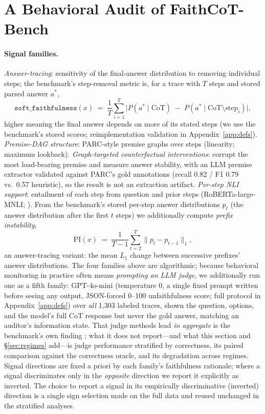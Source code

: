 \documentclass{article}
\begin{document}
\section{A Behavioral Audit of FaithCoT-Bench}
\label{sec:audit}

\paragraph{Signal families.} \emph{Answer-tracing}: sensitivity of the final-answer distribution to removing individual steps; the benchmark's step-removal metric is, for a trace with $T$ steps and stored parsed answer $a^{\ast}$,
\begin{equation}\label{eq:soft}
\texttt{soft\_faithfulness}(x) \;=\; \frac{1}{T}\sum_{i=1}^{T}\bigl\lvert P(a^{\ast}\mid \mathrm{CoT}) \;-\; P(a^{\ast}\mid \mathrm{CoT}\setminus \mathrm{step}_i)\bigr\rvert,
\end{equation}
higher meaning the final answer depends on more of its stated steps (we use the benchmark's stored scores; reimplementation validation in Appendix~\ref{app:defs}). \emph{Premise-DAG structure}: PARC-style premise graphs over steps (linearity; maximum lookback). \emph{Graph-targeted counterfactual interventions}: corrupt the most load-bearing premise and measure answer stability, with an LLM premise extractor validated against PARC's gold annotations (recall 0.82 / F1 0.79 vs.\ 0.57 heuristic), so the result is not an extraction artifact. \emph{Per-step NLI support}: entailment of each step from question and prior steps (RoBERTa-large-MNLI; \citealp{liu2019roberta,williams2018mnli}). From the benchmark's stored per-step answer distributions $p_t$ (the answer distribution after the first $t$ steps) we additionally compute \emph{prefix instability},
\begin{equation}\label{eq:pi}
\mathrm{PI}(x) \;=\; \frac{1}{T-1}\sum_{t=2}^{T}\bigl\lVert p_t - p_{t-1}\bigr\rVert_1,
\end{equation}
an answer-tracing variant: the mean $L_1$ change between successive prefixes' answer distributions. The four families above are algorithmic; because behavioral monitoring in practice often means \emph{prompting an LLM judge}, we additionally run one as a fifth family: GPT-4o-mini (temperature 0, a single fixed prompt written before seeing any output, JSON-forced 0--100 unfaithfulness score; full protocol in Appendix~\ref{app:defs}) over \emph{all} 1{,}303 labeled traces, shown the question, options, and the model's full CoT response but never the gold answer, matching an auditor's information state. That judge methods lead \emph{in aggregate} is the benchmark's own finding \citep{shen2026faithcot}; what it does not report---and what this section and \S\ref{sec:regimes} add---is judge performance stratified by correctness, its paired comparison against the correctness oracle, and its degradation across regimes. Signal directions are fixed a priori by each family's faithfulness rationale; where a signal discriminates only in the \emph{opposite} direction we report it explicitly as inverted. The choice to report a signal in its empirically discriminative (inverted) direction is a single sign selection made on the full data and reused unchanged in the stratified analyses.
\end{document}
